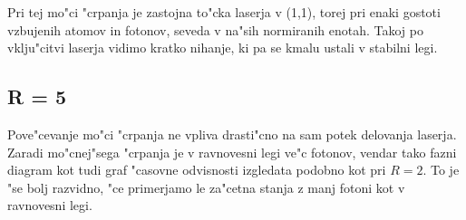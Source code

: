 \documentclass[a4paper,10pt]{article}
\begin{document}
Pri tej mo"ci "crpanja je zastojna to"cka laserja v (1,1), torej pri enaki gostoti vzbujenih atomov in fotonov, seveda v na"sih normiranih enotah. Takoj po vklju"citvi laserja vidimo kratko nihanje, ki pa se kmalu ustali v stabilni legi. 





\subsection{R = 5}

Pove"cevanje mo"ci "crpanja ne vpliva drasti"cno na sam potek delovanja laserja. Zaradi mo"cnej"sega "crpanja je v ravnovesni legi ve"c fotonov, vendar tako fazni diagram kot tudi graf "casovne odvisnosti izgledata podobno kot pri $R=2$. To je "se bolj razvidno, "ce primerjamo le za"cetna stanja z manj fotoni kot v ravnovesni legi. 



\end{document}

